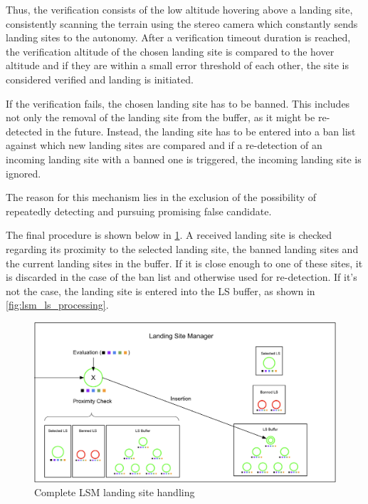 Thus, the verification consists of the low altitude hovering above a landing site, consistently scanning the terrain using the stereo camera which constantly sends landing sites to the autonomy. After a verification timeout duration is reached, the verification altitude of the chosen landing site is compared to the hover altitude and if they are within a small error threshold of each other, the site is considered verified and landing is initiated.

If the verification fails, the chosen landing site has to be banned. This includes not only the removal of the landing site from the buffer, as it might be re-detected in the future. Instead, the landing site has to be entered into a ban list against which new landing sites are compared and if a re-detection of an incoming landing site with a banned one is triggered, the incoming landing site is ignored. 

The reason for this mechanism lies in the exclusion of the possibility of repeatedly detecting and pursuing promising false candidate.

The final procedure is shown below in \cref{fig:lsm_complete}. A received landing site is checked regarding its proximity to the selected landing site, the banned landing sites and the current landing sites in the buffer. If it is close enough to one of these sites, it is discarded in the case of the ban list and otherwise used for re-detection. If it's not the case, the landing site is entered into the LS buffer, as shown in \cref{fig:lsm_ls_processing}.

\begin{figure}[h]
\centering
\includegraphics[scale=0.2]{images/autonomous_landing/lsm_complete.png}
\caption{Complete LSM landing site handling}
\label{fig:lsm_complete}
\end{figure}

